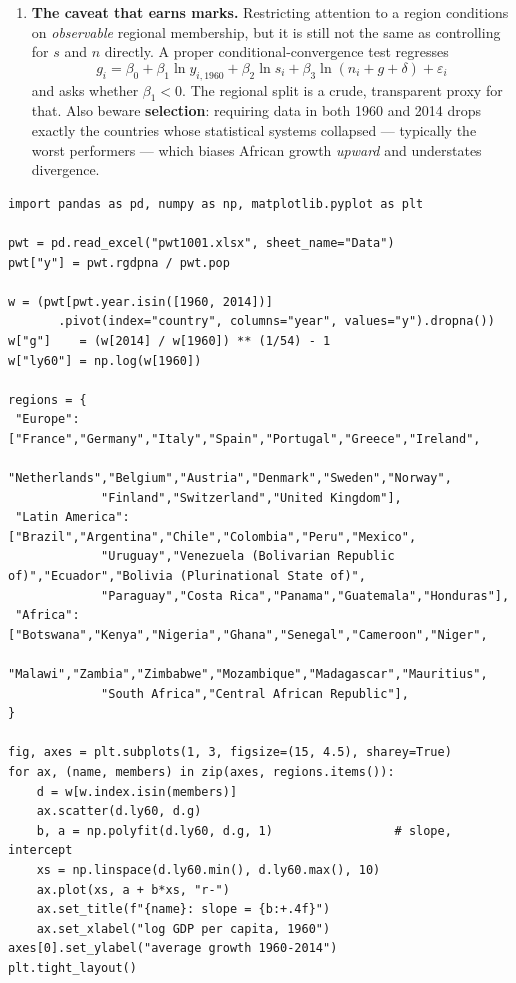 \documentclass[12pt, letterpaper]{article}
\begin{document}
\begin{tcolorbox}[oddbox,title={Problem 3.3 \quad Within-Region Convergence}]
\begin{enumerate}
This is the phenomenon of \textbf{convergence clubs}. Homogeneous groups converge internally;
the world as a whole does not.

\item \textbf{The caveat that earns marks.} Restricting attention to a region conditions on
\emph{observable} regional membership, but it is still not the same as controlling for $s$
and $n$ directly. A proper conditional-convergence test regresses
$$g_i = \beta_0 + \beta_1 \ln y_{i,1960} + \beta_2 \ln s_i + \beta_3 \ln(n_i + g + \delta)
+ \varepsilon_i$$
and asks whether $\beta_1 < 0$. The regional split is a crude, transparent proxy for that.
Also beware \textbf{selection}: requiring data in both 1960 and 2014 drops exactly the
countries whose statistical systems collapsed --- typically the worst performers --- which
biases African growth \emph{upward} and understates divergence.

\end{enumerate}

\begin{tcolorbox}[theorybox,title={Code}]
\footnotesize
\begin{verbatim}
import pandas as pd, numpy as np, matplotlib.pyplot as plt

pwt = pd.read_excel("pwt1001.xlsx", sheet_name="Data")
pwt["y"] = pwt.rgdpna / pwt.pop

w = (pwt[pwt.year.isin([1960, 2014])]
       .pivot(index="country", columns="year", values="y").dropna())
w["g"]    = (w[2014] / w[1960]) ** (1/54) - 1
w["ly60"] = np.log(w[1960])

regions = {
 "Europe":  ["France","Germany","Italy","Spain","Portugal","Greece","Ireland",
             "Netherlands","Belgium","Austria","Denmark","Sweden","Norway",
             "Finland","Switzerland","United Kingdom"],
 "Latin America": ["Brazil","Argentina","Chile","Colombia","Peru","Mexico",
             "Uruguay","Venezuela (Bolivarian Republic of)","Ecuador","Bolivia (Plurinational State of)",
             "Paraguay","Costa Rica","Panama","Guatemala","Honduras"],
 "Africa":  ["Botswana","Kenya","Nigeria","Ghana","Senegal","Cameroon","Niger",
             "Malawi","Zambia","Zimbabwe","Mozambique","Madagascar","Mauritius",
             "South Africa","Central African Republic"],
}

fig, axes = plt.subplots(1, 3, figsize=(15, 4.5), sharey=True)
for ax, (name, members) in zip(axes, regions.items()):
    d = w[w.index.isin(members)]
    ax.scatter(d.ly60, d.g)
    b, a = np.polyfit(d.ly60, d.g, 1)                 # slope, intercept
    xs = np.linspace(d.ly60.min(), d.ly60.max(), 10)
    ax.plot(xs, a + b*xs, "r-")
    ax.set_title(f"{name}: slope = {b:+.4f}")
    ax.set_xlabel("log GDP per capita, 1960")
axes[0].set_ylabel("average growth 1960-2014")
plt.tight_layout()
\end{verbatim}
\end{tcolorbox}
\end{tcolorbox}
\end{document}
